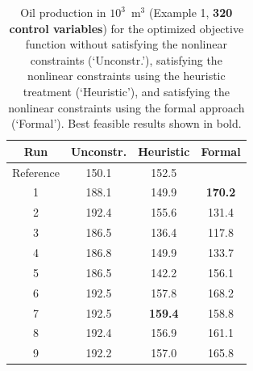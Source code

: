             
\begin{table}
\centering
\caption{Oil production in $10^3$~m$^3$ (Example 1, {\bf 320 control variables}) for the optimized objective function
         without satisfying the nonlinear constraints (`Unconstr.'), satisfying the nonlinear constraints
         using the heuristic treatment (`Heuristic'), and satisfying the nonlinear constraints
         using the formal approach (`Formal'). Best feasible results shown in bold.}
\begin{tabular}{|c|c|c|c|}
\hline
   Run & Unconstr. & Heuristic & Formal                          \\
\hline
Reference             & 150.1         &  152.5                      &                     \\
1                     & 188.1         &  149.9                      &  \bf{ 170.2 }        \\
2                     & 192.4         &  155.6                      &         131.4            \\
3                     & 186.5         &  136.4                      &         117.8          \\
4                     & 186.8         &  149.9                      &         133.7          \\
5                     & 186.5         &  142.2                      &         156.1          \\
6                     & 192.5         &  157.8                      &         168.2          \\
7                     & 192.5         &  \bf{159.4}               &         158.8          \\ 
8                     & 192.4         &  156.9                      &         161.1          \\
9                     & 192.2         &  157.0                      &         165.8          \\
\hline
\end{tabular}
  \label{table:PiC500Steps64}
\end{table}
 
 
 
 

 



%       
%
%
%
%
%
%

